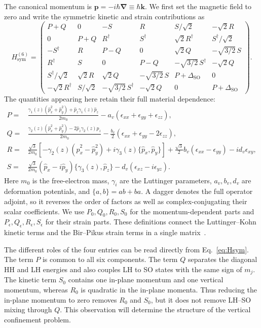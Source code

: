 \documentclass[10pt,letterpaper]{article}
\newcommand{\ep}{\epsilon}
\newcommand{\SO}{\mathrm{SO}}
\begin{document}
The canonical momentum is $\bm p=-i\hbar\bm\nabla\equiv\hbar\bm k$. We first set the magnetic field to zero and write the symmetric kinetic and strain contributions as
\begin{equation}
H_{\mathrm{sym}}^{(6)}=
\begin{pmatrix}
P+Q&0&-S&R&S/\sqrt2&-\sqrt2R\\
0&P+Q&R^\dagger&S^\dagger&\sqrt2R^\dagger&S^\dagger/\sqrt2\\
-S^\dagger&R&P-Q&0&\sqrt2Q&-\sqrt{3/2}\,S\\
R^\dagger&S&0&P-Q&-\sqrt{3/2}\,S^\dagger&-\sqrt2Q\\
S^\dagger/\sqrt2&\sqrt2R&\sqrt2Q&-\sqrt{3/2}\,S&P+\Delta_{\SO}&0\\
-\sqrt2R^\dagger&S/\sqrt2&-\sqrt{3/2}\,S^\dagger&-\sqrt2Q&0&P+\Delta_{\SO}
\end{pmatrix}.
\label{eq:Hsym}
\end{equation}
The quantities appearing here retain their full material dependence:
\begin{align}
P={}&\frac{\gamma_1(z)( \hat{p}_ x^2+ \hat{p}_ y^2)+ \hat{p}_ z\gamma_1(z) \hat{p}_ z}{2m_0}
-a_v(\ep_ {xx}+\ep_ {yy}+\ep_ {zz}),\label{eq:P}\\
Q={}&\frac{\gamma_2(z)( \hat{p}_ x^2+ \hat{p}_ y^2)-2 \hat{p}_ z\gamma_2(z) \hat{p}_ z}{2m_0}
-\frac{b_v}{2}(\ep_ {xx}+\ep_ {yy}-2\ep_ {zz}),\label{eq:Q}\\
R={}&\frac{\sqrt3}{2m_0}\left[-\gamma_2(z)( \hat{p}_ x^2- \hat{p}_ y^2)
+i\gamma_3(z)\{ \hat{p}_ x, \hat{p}_ y\}\right]
+\frac{\sqrt3}{2}b_v(\ep_ {xx}-\ep_ {yy})-id_v\ep_ {xy},\label{eq:R}\\
S={}&\frac{\sqrt3}{2m_0}( \hat{p}_ x-i \hat{p}_ y)\{\gamma_3(z), \hat{p}_ z\}
-d_v(\ep_ {xz}-i\ep_ {yz}).\label{eq:S}
\end{align}
Here $m_0$ is the free-electron mass, $\gamma_i$ are the Luttinger parameters, $a_v,b_v,d_v$ are deformation potentials, and $\{a,b\}=ab+ba$. A dagger denotes the full operator adjoint, so it reverses the order of factors as well as complex-conjugating their scalar coefficients. We use $P_0,Q_0,R_0,S_0$ for the momentum-dependent parts and $P_\ep,Q_\ep,R_\ep,S_\ep$ for their strain parts. These definitions connect the Luttinger--Kohn kinetic terms and the Bir--Pikus strain terms in a single matrix~\cite{luttingerkohn,birpikus,winkler}.

The different roles of the four entries can be read directly from Eq.~\eqref{eq:Hsym}. The term $P$ is common to all six components. The term $Q$ separates the diagonal HH and LH energies and also couples LH to SO states with the same sign of $m_j$. The kinetic term $S_0$ contains one in-plane momentum and one vertical momentum, whereas $R_0$ is quadratic in the in-plane momenta. Thus reducing the in-plane momentum to zero removes $R_0$ and $S_0$, but it does not remove LH--SO mixing through $Q$. This observation will determine the structure of the vertical confinement problem.
\end{document}
